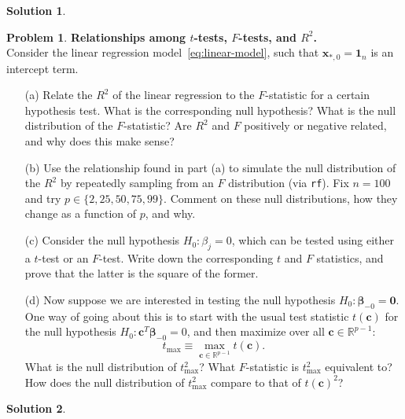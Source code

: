 \documentclass[11pt,letterpaper,english,oneside]{article} %
\theoremstyle{definition} %
\newtheorem{problem}{Problem}
\newtheorem{solution}{Solution}
\newenvironment{prob}{\clearpage \begin{problem}\hspace{0pt}}{\end{problem}}
\newenvironment{sol}{\begin{solution}\hspace{0pt}}{\end{solution}}
\begin{document}
    \begin{sol}
    \end{sol}
    
    \begin{prob} \textbf{Relationships among $t$-tests, $F$-tests, and $R^2$.} \\
    
    \noindent Consider the linear regression model~\eqref{eq:linear-model}, such that $\bm x_{*,0} = \bm 1_n$ is an intercept term.
    
    \begin{itemize}
    \item[(a)] Relate the $R^2$ of the linear regression to the $F$-statistic for a certain hypothesis test. What is the corresponding null hypothesis? What is the null distribution of the $F$-statistic? Are $R^2$ and $F$ positively or negative related, and why does this make sense?
    
    \item[(b)] Use the relationship found in part (a) to simulate the null distribution of the $R^2$ by repeatedly sampling from an $F$ distribution (via \verb|rf|). Fix $n = 100$ and try $p \in \{2, 25, 50, 75, 99\}$. Comment on these null distributions, how they change as a function of $p$, and why. 
    
    \item[(c)] Consider the null hypothesis $H_0: \beta_j = 0$, which can be tested using either a $t$-test or an $F$-test. Write down the corresponding $t$ and $F$ statistics, and prove that the latter is the square of the former. 
    
    \item[(d)] Now suppose we are interested in testing the null hypothesis $H_0: \bm \beta_{-0} = \bm 0$. One way of going about this is to start with the usual test statistic $t(\bm c)$ for the null hypothesis $H_0: \bm c^T \bm \beta_{-0} = 0$, and then maximize over all $\bm c \in \mathbb R^{p-1}$:
    \begin{equation}
    t_{\max} \equiv \max_{\bm c \in \mathbb R^{p-1}} t(\bm c).
    \end{equation}
    What is the null distribution of $t_{\max}^2$? What $F$-statistic is $t_{\max}^2$ equivalent to? How does the null distribution of $t_{\max}^2$ compare to that of $t(\bm c)^2$?
    
    \end{itemize}
    
    \end{prob}
    \begin{sol}
    \end{sol}
    
\end{document}
